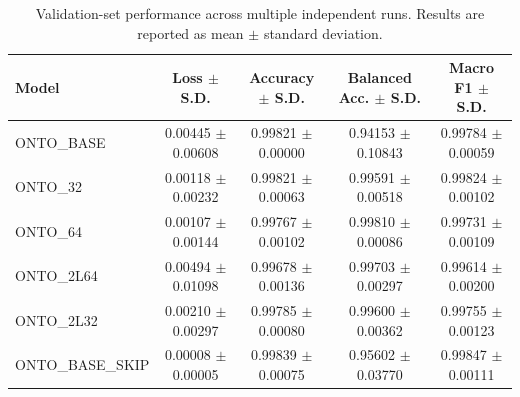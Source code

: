 \begin{table}[t]
\centering
\begin{tabular}{l c c c c}
\toprule
Model & Loss $\pm$ S.D. & Accuracy $\pm$ S.D. & Balanced Acc. $\pm$ S.D. & Macro F1 $\pm$ S.D. \\
\midrule
ONTO_BASE & 0.00445 $\pm$ 0.00608 & 0.99821 $\pm$ 0.00000 & 0.94153 $\pm$ 0.10843 & 0.99784 $\pm$ 0.00059 \\
ONTO_32 & 0.00118 $\pm$ 0.00232 & 0.99821 $\pm$ 0.00063 & 0.99591 $\pm$ 0.00518 & 0.99824 $\pm$ 0.00102 \\
ONTO_64 & 0.00107 $\pm$ 0.00144 & 0.99767 $\pm$ 0.00102 & 0.99810 $\pm$ 0.00086 & 0.99731 $\pm$ 0.00109 \\
ONTO_2L64 & 0.00494 $\pm$ 0.01098 & 0.99678 $\pm$ 0.00136 & 0.99703 $\pm$ 0.00297 & 0.99614 $\pm$ 0.00200 \\
ONTO_2L32 & 0.00210 $\pm$ 0.00297 & 0.99785 $\pm$ 0.00080 & 0.99600 $\pm$ 0.00362 & 0.99755 $\pm$ 0.00123 \\
ONTO_BASE_SKIP & 0.00008 $\pm$ 0.00005 & 0.99839 $\pm$ 0.00075 & 0.95602 $\pm$ 0.03770 & 0.99847 $\pm$ 0.00111 \\
\bottomrule
\end{tabular}
\caption{Validation-set performance across multiple independent runs. Results are reported as mean $\pm$ standard deviation.}
\label{tab:validation_results}
\end{table}